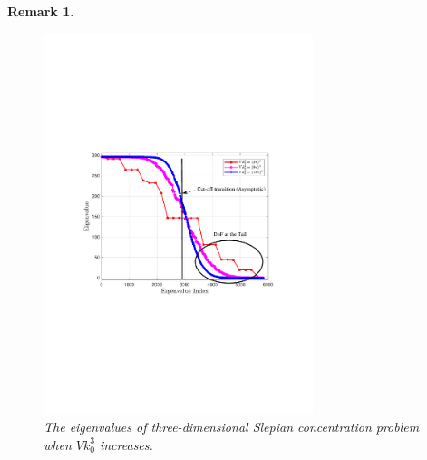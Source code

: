 \documentclass[12pt,draftclsnofoot,journal,onecolumn]{IEEEtran}
\newtheorem{remark}{Remark}
\begin{document}
{\begin{remark}
			\begin{figure}
		\centering 
		\includegraphics[width=0.7\textwidth]{figs/save_3d_different_Vk.pdf} 
		\caption{\color{red} The eigenvalues of three-dimensional Slepian concentration problem when $V k_0^3$ increases.} 
		\label{3d_Vk}
	\end{figure}



	\end{remark}
}
   
\end{document}
